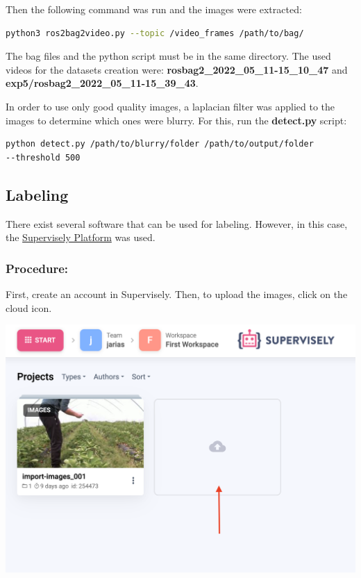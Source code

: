 \documentclass[12pt]{article}
\begin{document}
Then the following command was run and the images were extracted:

\begin{lstlisting}[language=sh]
python3 ros2bag2video.py --topic /video_frames /path/to/bag/
\end{lstlisting}
The bag files and the python script must be in the same directory.
The used videos for the datasets creation were: \textbf{rosbag2\_2022\_05\_11-15\_10\_47} and \textbf{exp5/rosbag2\_2022\_05\_11-15\_39\_43}.

In order to use only good quality images, a laplacian filter was applied to the images to determine which ones were blurry. For this, run the \textbf{detect.py} script:

\begin{lstlisting}[language=sh]
python detect.py /path/to/blurry/folder /path/to/output/folder 
--threshold 500
\end{lstlisting}

\subsection{Labeling}
There exist several software that can be used for labeling. However, in this case, the \href{https://supervisely.com/}{Supervisely Platform} was used. 
\subsubsection*{Procedure:}
First, create an account in Supervisely. Then, to upload the images, click on the cloud icon.
\begin{center}
\includegraphics[width=1.0\textwidth]{Bilder/upload_1}
\end{center}
\end{document}

